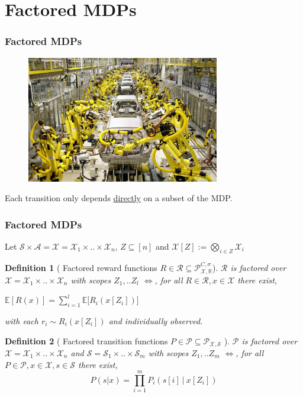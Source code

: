 \documentclass{beamer}
\newtheorem{mydef}{Definition}
\newcommand{\Exp}{\mathds{E}}
\newcommand{\Real}{\mathds{R}}
\newcommand{\Xc}{\mathcal{X}}
\newcommand{\Pc}{\mathcal{P}}
\newcommand{\Rc}{\mathcal{R}}
\newcommand{\Sc}{\mathcal{S}}
\newcommand{\Ac}{\mathcal{A}}
\begin{document}
\section{Factored MDPs}
\begin{frame}
\frametitle{Factored MDPs}
\centering
\begin{figure}
\includegraphics[width=0.75\textwidth]{./media/productionLine}
\end{figure}
Each transition only depends \underline{directly} on a subset of the MDP.
\end{frame}


\begin{frame}
\frametitle{Factored MDPs}
Let $\Sc \times \Ac = \Xc = \Xc_1 \times .. \times \Xc_n$, $Z \subseteq [n]$ and
$ \Xc[Z] := \bigotimes\limits_{i \in Z} \Xc_i $

\begin{mydef}[ Factored reward functions $R \in \Rc \subseteq \Pc^{C,\sigma}_{\Xc,\Real} $]
$\Rc$ is factored over $\Xc = \Xc_1 \times .. \times \Xc_n $ with scopes $Z_1, .. Z_l$ $\iff$,
for all $R \in \Rc, x \in \Xc$ there exist,
\begin{center}
$ \Exp [ R(x) ] = \sum_{i=1}^l \Exp\big[ R_i(x[Z_i]) \big] $
\end{center}
with each $r_i \sim R_i(x[Z_i])$ and individually observed.
\end{mydef}


\begin{mydef}[ Factored transition functions $P \in \Pc \subseteq \Pc_{\Xc,\Sc}$ ]
$\Pc$ is factored over $\Xc = \Xc_1 \times .. \times \Xc_n$ and $\Sc = \Sc_1 \times .. \times \Sc_m$ with scopes  $Z_1, .. Z_m$ $\iff$,
for all $P \in \Pc, x \in \Xc, s \in \Sc$ there exist,
$$ P(s | x) = \prod_{i=1}^m P_i \left( s[i] \ \bigg\vert \ x[Z_i] \right) $$
\end{mydef}
\end{frame}
\end{document}
